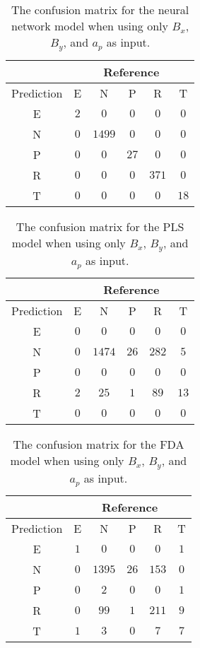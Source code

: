 \begin{table}[!ht]
	\centering
	\begin{tabular}{|c|c|c|c|c|c|}
		\hline
		 & \multicolumn{5}{|c|}{Reference} \\ \hline
		 Prediction & E & N & P & R & T \\ \hline
		 E & $2$ & $0$ & $0$ & $0$ & $0$ \\ \hline
		 N & $0$ & $1499$ & $0$ & $0$ & $0$ \\ \hline
		 P & $0$ & $0$ & $27$ & $0$ & $0$ \\ \hline
		 R & $0$ & $0$ & $0$ & $371$ & $0$ \\ \hline
		 T & $0$ & $0$ & $0$ & $0$ & $18$ \\ \hline
	\end{tabular}
	\caption{The confusion matrix for the neural network model when using only $B_{x}$, $B_{y}$, and $a_{p}$ as input.}
	\label{tab:cm:xyap:nnet}
\end{table}

\begin{table}[!ht]
	\centering
	\begin{tabular}{|c|c|c|c|c|c|}
		\hline
		 & \multicolumn{5}{|c|}{Reference} \\ \hline
		 Prediction & E & N & P & R & T \\ \hline
		 E & $0$ & $0$ & $0$ & $0$ & $0$ \\ \hline
		 N & $0$ & $1474$ & $26$ & $282$ & $5$ \\ \hline
		 P & $0$ & $0$ & $0$ & $0$ & $0$ \\ \hline
		 R & $2$ & $25$ & $1$ & $89$ & $13$ \\ \hline
		 T & $0$ & $0$ & $0$ & $0$ & $0$ \\ \hline
	\end{tabular}
	\caption{The confusion matrix for the PLS model when using only $B_{x}$, $B_{y}$, and $a_{p}$ as input.}
	\label{tab:cm:xyap:pls}
\end{table}

\begin{table}[!ht]
	\centering
	\begin{tabular}{|c|c|c|c|c|c|}
		\hline
		 & \multicolumn{5}{|c|}{Reference} \\ \hline
		 Prediction & E & N & P & R & T \\ \hline
		 E & $1$ & $0$ & $0$ & $0$ & $1$ \\ \hline
		 N & $0$ & $1395$ & $26$ & $153$ & $0$ \\ \hline
		 P & $0$ & $2$ & $0$ & $0$ & $1$ \\ \hline
		 R & $0$ & $99$ & $1$ & $211$ & $9$ \\ \hline
		 T & $1$ & $3$ & $0$ & $7$ & $7$ \\ \hline
	\end{tabular}
	\caption{The confusion matrix for the FDA model when using only $B_{x}$, $B_{y}$, and $a_{p}$ as input.}
	\label{tab:cm:xyap:fda}
\end{table}

